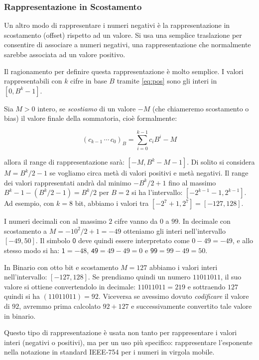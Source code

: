 \subsubsection{Rappresentazione in Scostamento}

Un altro modo di rappresentare i numeri negativi è la rappresentazione in scostamento (offset) rispetto ad un valore. Si usa una semplice traslazione
per consentire di associare a numeri negativi, una rappresentazione che normalmente sarebbe associata ad un valore positivo.
 
Il ragionamento per definire questa rappresentazione è molto semplice. I valori
rappresentabili con $k$ cifre in base $B$ tramite \eqref{eq:pos} sono gli interi in $[0,B^k-1]$. 

Sia $M > 0$ intero, se \emph{scostiamo} di un valore $-M$ (che chiameremo scostamento o bias) il valore finale della sommatoria, cioè formalmente:

\[ (c_{k-1}\,\cdots\,c_{0})_B = \sum_{i=0}^{k-1} c_iB^i - M \] 

\noindent allora il range di rappresentazione sarà: $[-M,B^k-M-1]$. Di solito
si considera $M = B^k/2-1$ se vogliamo circa metà di valori positivi e metà negativi. Il range dei valori rappresentati andrà dal minimo $-B^k/2+1$ fino al massimo $B^k-1-(B^k/2-1) = B^k/2$ per $B=2$ si ha l'intervallo: $[-2^{k-1}-1,2^{k-1}]$. Ad esempio, con $k = 8$ bit, abbiamo i valori tra $[-2^7+1,2^7] = [-127,128]$.

\begin{ex} I numeri decimali con al massimo $2$ cifre vanno da $0$ a $99$. In decimale con scostamento a $M = -10^2/2 + 1 = -49$ otteniamo gli interi nell'intervallo $[-49,50]$. Il simbolo $\mathsf 0$ deve quindi essere interpretato come $0-49 = -49$, e allo stesso modo si ha: $\mathsf{1} = -48$, $\mathsf{49} = 49 - 49 = 0$ e $\mathsf{99} = 99 - 49 = 50$.

In Binario con otto bit e scostamento $M = 127$ abbiamo i valori interi nell'intervallo: $[-127,128]$. Se prendiamo quindi un numero $11011011$, il suo valore si ottiene convertendolo in decimale:
$11011011 = 219$ e sottraendo $127$ quindi si ha $(11011011) = 92$. Viceversa se avessimo dovuto \emph{codificare} il valore di $92$, avremmo prima calcolato $92+127$ e successivamente convertito tale valore in binario.
\end{ex}	

Questo tipo di rappresentazione è usata non tanto per rappresentare i valori interi (negativi o positivi), ma per un uso più specifico: rappresentare l'esponente nella notazione in standard \textrm{IEEE-754} per i numeri in virgola mobile.


